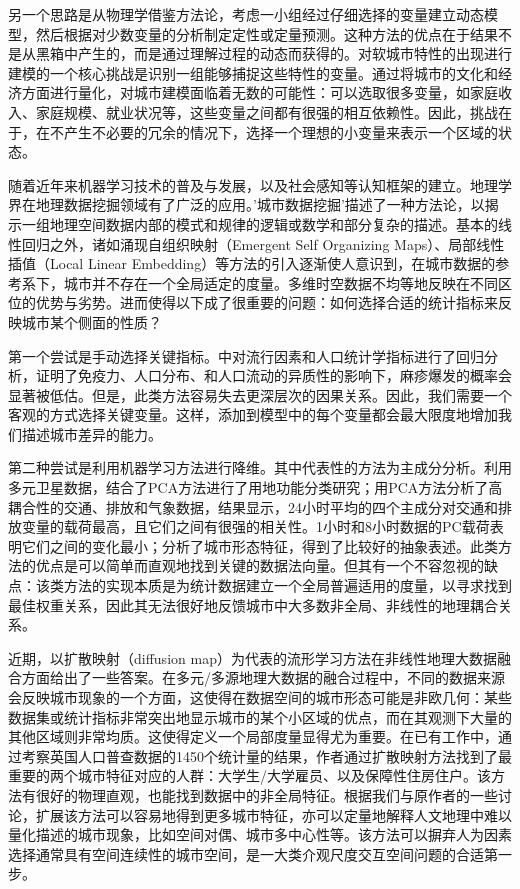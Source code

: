 另一个思路是从物理学借鉴方法论，考虑一小组经过仔细选择的变量建立动态模型，然后根据对少数变量的分析制定定性或定量预测。这种方法的优点在于结果不是从黑箱中产生的，而是通过理解过程的动态而获得的。对软城市特性的出现进行建模的一个核心挑战是识别一组能够捕捉这些特性的变量。通过将城市的文化和经济方面进行量化，对城市建模面临着无数的可能性：可以选取很多变量，如家庭收入、家庭规模、就业状况等，这些变量之间都有很强的相互依赖性。因此，挑战在于，在不产生不必要的冗余的情况下，选择一个理想的小变量来表示一个区域的状态。

随着近年来机器学习技术的普及与发展，以及社会感知等认知框架的建立。地理学界在地理数据挖掘领域有了广泛的应用。'城市数据挖掘'描述了一种方法论，以揭示一组地理空间数据内部的模式和规律的逻辑或数学和部分复杂的描述\cite{behnisch2009urban, bendimerad2016unsupervised}。基本的线性回归之外，诸如涌现自组织映射（Emergent Self Organizing Maps）、局部线性插值（Local Linear Embedding）等方法的引入逐渐使人意识到，在城市数据的参考系下，城市并不存在一个全局适定的度量。多维时空数据不均等地反映在不同区位的优势与劣势。进而使得以下成了很重要的问题：如何选择合适的统计指标来反映城市某个侧面的性质？

第一个尝试是手动选择关键指标。\cite{bosetti2020heterogeneity}中对流行因素和人口统计学指标进行了回归分析，证明了免疫力、人口分布、和人口流动的异质性的影响下，麻疹爆发的概率会显著被低估。但是，此类方法容易失去更深层次的因果关系。因此，我们需要一个客观的方式选择关键变量。这样，添加到模型中的每个变量都会最大限度地增加我们描述城市差异的能力。


第二种尝试是利用机器学习方法进行降维。其中代表性的方法为主成分分析。\cite{deng2008pca}利用多元卫星数据，结合了PCA方法进行了用地功能分类研究；\cite{nagendra2003principal}用PCA方法分析了高耦合性的交通、排放和气象数据，结果显示，24小时平均的四个主成分对交通和排放变量的载荷最高，且它们之间有很强的相关性。1小时和8小时数据的PC载荷表明它们之间的变化最小；\cite{palmason2005classification}分析了城市形态特征，得到了比较好的抽象表述。此类方法的优点是可以简单而直观地找到关键的数据法向量。但其有一个不容忽视的缺点：该类方法的实现本质是为统计数据建立一个全局普遍适用的度量，以寻求找到最佳权重关系，因此其无法很好地反馈城市中大多数非全局、非线性的地理耦合关系。

近期，以扩散映射（diffusion map）\cite{barter2019manifold}为代表的流形学习方法在非线性地理大数据融合方面给出了一些答案。在多元/多源地理大数据的融合过程中，不同的数据来源会反映城市现象的一个方面，这使得在数据空间的城市形态可能是非欧几何：某些数据集或统计指标非常突出地显示城市的某个小区域的优点，而在其观测下大量的其他区域则非常均质。这使得定义一个局部度量显得尤为重要。在已有工作\cite{barter2019manifold}中，通过考察英国人口普查数据的1450个统计量的结果，作者通过扩散映射方法找到了最重要的两个城市特征对应的人群：大学生/大学雇员、以及保障性住房住户。该方法有很好的物理直观，也能找到数据中的非全局特征。根据我们与原作者的一些讨论，扩展该方法可以容易地得到更多城市特征，亦可以定量地解释人文地理中难以量化描述的城市现象，比如空间对偶\cite{lomi2000density}、城市多中心性等\cite{gordon1986distribution, mcmillen1997nonparametric}。该方法可以摒弃人为因素选择通常具有空间连续性的城市空间，是一大类介观尺度交互空间问题的合适第一步。


